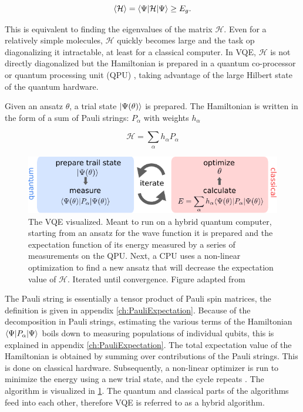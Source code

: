 \begin{equation}\label{eq:VariationalPrinciple}
	\left\langle \mathcal{H} \right\rangle = \langle\Psi\rvert\mathcal{H} \lvert\Psi\rangle \geq E_g.
\end{equation}

This is equivalent to finding the eigenvalues of the matrix $\mathcal{H}$. Even for a relatively simple molecules, $\mathcal{H}$ quickly becomes large and the task op diagonalizing it intractable, at least for a classical computer. In \ac{VQE}, $\mathcal{H}$ is not directly diagonalized but the Hamiltonian is prepared in a quantum co-processor or quantum processing unit (QPU) \cite{Henriet2020,Peruzzo2014}, taking advantage of the large Hilbert state of the quantum hardware. 

Given an ansatz $\theta$, a trial state $\lvert\Psi(\theta)\rangle$ is prepared. The Hamiltonian is written in the form of a sum of Pauli strings: $P_{\alpha}$ with weights $h_{\alpha}$ \cite{McClean2016,Moll2018}

\begin{equation}\label{eq:PauliDecomposition}
	\mathcal{H} = \sum_{\alpha} h_{\alpha} P_{\alpha}
\end{equation}

\begin{figure}
	\centering
	\includegraphics[width=0.75\linewidth]{figures/VQE.pdf}
	\caption{The \ac{VQE} visualized. Meant to run on a hybrid quantum computer, starting from an ansatz for the wave function it is prepared and the expectation function of its energy measured by a series of measurements on the QPU. Next, a CPU uses a non-linear optimization to find a new ansatz that will decrease the expectation value of $\mathcal{H}$. Iterated until convergence. Figure adapted from \cite{Moll2018}}
	\label{fig:VQE}
\end{figure}

The Pauli string is essentially a tensor product of Pauli spin matrices, the definition is given in appendix \ref{ch:PauliExpectation}. Because of the decomposition in Pauli strings, estimating the various terms of the Hamiltonian $\langle\Psi\rvert P_{\alpha} \lvert\Psi\rangle$ boils down to measuring populations of individual qubits, this is explained in appendix \ref{ch:PauliExpectation}. The total expectation value of the Hamiltonian is obtained by summing over contributions of the Pauli strings. This is done on classical hardware. Subsequently, a non-linear optimizer is run to minimize the energy using a new trial state, and the cycle repeats \cite{Moll2018}. The algorithm is visualized in \cref{fig:VQE}. The quantum and classical parts of the algorithms feed into each other, therefore \ac{VQE} is referred to as a hybrid algorithm. 


